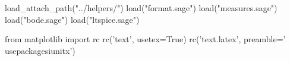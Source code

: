 \begin{sagesilent}
    load_attach_path("../helpers/")
    load("format.sage")
    load("measures.sage")
    load("bode.sage")
    load("ltspice.sage")

    from matplotlib import rc
    rc('text', usetex=True)
    rc('text.latex', preamble='\\usepackage{siunitx}')
\end{sagesilent}